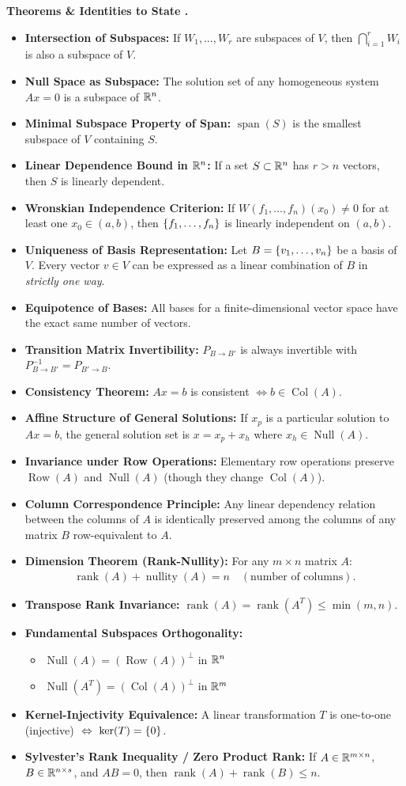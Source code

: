\documentclass{natsirt}
\newcounter{topic}[section]
\newenvironment{theoremsbox}[1][]{%
    \begin{greenbox}[#1]\refstepcounter{topic}\textbf{Theorems \& Identities to State \thesection.\thetopic}%
}{\end{greenbox}}
\newcommand{\citem}{\item[$\square$]}
\newcommand{\Null}{\operatorname{Null}}
\newcommand{\Row}{\operatorname{Row}}
\newcommand{\Col}{\operatorname{Col}}
\newcommand{\rank}{\operatorname{rank}}
\newcommand{\nullity}{\operatorname{nullity}}
\newcommand{\Span}{\operatorname{span}}
\begin{document}
\begin{theoremsbox}
    \begin{itemize}
        \citem \textbf{Intersection of Subspaces:} If $W_1, \dots, W_r$ are subspaces of $V$, then $\bigcap_{i=1}^r W_i$ is also a subspace of $V$.
        \citem \textbf{Null Space as Subspace:} The solution set of any homogeneous system $Ax = 0$ is a subspace of $\mathbb{R}^n$.
        \citem \textbf{Minimal Subspace Property of Span:} $\Span(S)$ is the smallest subspace of $V$ containing $S$.
        \citem \textbf{Linear Dependence Bound in $\mathbb{R}^n$:} If a set $S \subset \mathbb{R}^n$ has $r > n$ vectors, then $S$ is linearly dependent.
        \citem \textbf{Wronskian Independence Criterion:} If $W(f_1, \dots, f_n)(x_0) \neq 0$ for at least one $x_0 \in (a, b)$, then $\left\{ f_1, \dots, f_n \right\}$ is linearly independent on $(a, b)$.
        \citem \textbf{Uniqueness of Basis Representation:} Let $B = \left\{ v_1, \dots, v_n \right\}$ be a basis of $V$. Every vector $v \in V$ can be expressed as a linear combination of $B$ in \emph{strictly one way}.
        \citem \textbf{Equipotence of Bases:} All bases for a finite-dimensional vector space have the exact same number of vectors.
        \citem \textbf{Transition Matrix Invertibility:} $P_{B \to B'}$ is always invertible with $P_{B \to B'}^{-1} = P_{B' \to B}$.
        \citem \textbf{Consistency Theorem:} $Ax = b$ is consistent $\iff b \in \Col(A)$.
        \citem \textbf{Affine Structure of General Solutions:} If $x_p$ is a particular solution to $Ax = b$, the general solution set is $x = x_p + x_h$ where $x_h \in \Null(A)$.
        \citem \textbf{Invariance under Row Operations:} Elementary row operations preserve $\Row(A)$ and $\Null(A)$ (though they change $\Col(A)$).
        \citem \textbf{Column Correspondence Principle:} Any linear dependency relation between the columns of $A$ is identically preserved among the columns of any matrix $B$ row-equivalent to $A$.
        \citem \textbf{Dimension Theorem (Rank-Nullity):} For any $m \times n$ matrix $A$:
        \begin{align*}
            \rank(A) + \nullity(A) = n \quad (\text{number of columns}).
        \end{align*}
        \citem \textbf{Transpose Rank Invariance:} $\rank(A) = \rank(A^T) \le \min(m, n)$.
        \citem \textbf{Fundamental Subspaces Orthogonality:}
        \begin{itemize}
            \item $\Null(A) = (\Row(A))^\perp$ in $\mathbb{R}^n$
            \item $\Null(A^T) = (\Col(A))^\perp$ in $\mathbb{R}^m$
        \end{itemize}
        \citem \textbf{Kernel-Injectivity Equivalence:} A linear transformation $T$ is one-to-one (injective) $\ \Leftrightarrow \  \ker(T) = \left\{ 0 \right\}$.
        \citem \textbf{Sylvester's Rank Inequality / Zero Product Rank:} If $A \in \mathbb{R}^{m \times n}$, $B \in \mathbb{R}^{n \times s}$, and $AB = 0$, then $\rank(A) + \rank(B) \le n$.
    \end{itemize}
\end{theoremsbox}
\end{document}
